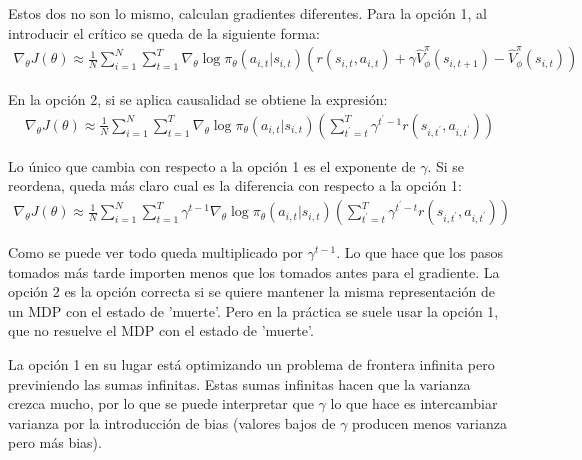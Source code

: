 Estos dos no son lo mismo, calculan gradientes diferentes. Para la opción 1, al introducir el
crítico se queda de la siguiente forma:
\begin{align}
\nabla _ { \theta } J ( \theta ) \approx \frac { 1 } { N } \sum _ { i = 1 } ^ { N } \sum _ { t = 1 } ^ { T } \nabla _ { \theta } \operatorname { log } \pi _ { \theta } ( a _ { i , t } | s _ { i , t } ) ( r ( s _ { i , t } , a _ { i , t } ) + \gamma \hat { V } _ { \phi } ^ { \pi } ( s _ { i , t + 1 } ) - \hat { V } _ { \phi } ^ { \pi } ( s _ { i , t } ) )
\end{align}

En la opción 2, si se aplica causalidad se obtiene la expresión:
\begin{align}
\nabla _ { \theta } J ( \theta ) \approx \frac { 1 } { N } \sum _ { i = 1 } ^ { N } \sum _ { t = 1 } ^ { T } \nabla _ { \theta } \operatorname { log } \pi _ { \theta } ( a _ { i , t } | s _ { i , t } ) ( \sum _ { t ^ { \prime } = t } ^ { T } \gamma ^ { t ^ { \prime } - 1 } r ( s _ { i , t ^ { \prime } } , a _ { i , t ^ { \prime } } ) )
\end{align}

Lo único que cambia con respecto a la opción 1 es el exponente de $\gamma$. Si se reordena,
queda más claro cual es la diferencia con respecto a la opción 1:
\begin{align}
\nabla _ { \theta } J ( \theta ) \approx \frac { 1 } { N } \sum _ { i = 1 } ^ { N } \sum _ { t = 1 } ^ { T } \gamma ^ { t - 1 } \nabla _ { \theta } \operatorname { log } \pi _ { \theta } ( a _ { i , t } | s _ { i , t } ) ( \sum _ { t ^ { \prime } = t } ^ { T } \gamma ^ { t ^ { \prime } - t } r ( s _ { i , t ^ { \prime } } , a _ { i , t ^ { \prime } } ) )
\end{align}

Como se puede ver todo queda multiplicado por $\gamma^{t-1}$. Lo que hace que los pasos tomados
más tarde importen menos que los tomados antes para el gradiente. La opción 2 es la opción
correcta si se quiere mantener la misma representación de un MDP con el estado de 'muerte'.
Pero en la práctica se suele usar la opción 1, que no resuelve el MDP con el estado de 'muerte'.

La opción 1 en su lugar está optimizando un problema de frontera infinita pero previniendo las
sumas infinitas. Estas sumas infinitas hacen que la varianza crezca mucho, por lo que se puede
interpretar que $\gamma$ lo que hace es intercambiar varianza por la introducción de bias
(valores bajos de $\gamma$ producen menos varianza pero más bias).

